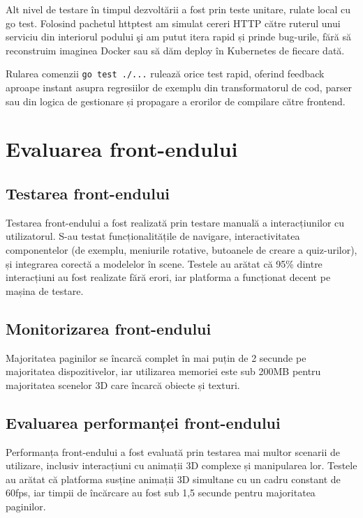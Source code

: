 Alt nivel de testare în timpul dezvoltării a fost prin teste unitare,
rulate local cu go test. Folosind pachetul httptest am
simulat cereri HTTP către ruterul unui serviciu din interiorul podului şi am putut
itera rapid și prinde bug-urile, fără să reconstruim imaginea Docker
sau să dăm deploy în Kubernetes de fiecare dată.

Rularea comenzii \verb|go test ./...| rulează orice test rapid,
oferind feedback aproape instant asupra
regresiilor de exemplu din transformatorul de cod, parser sau din logica de
gestionare și propagare a erorilor de compilare către frontend.

\section{Evaluarea front-endului}
\label{subsec:evaluare-frontend}

\subsection{Testarea front-endului}
\label{subsubsec:evaluare-frontend-testare}

Testarea front-endului a fost realizată prin testare manuală a interacțiunilor cu utilizatorul. 
S-au testat funcționalitățile de navigare, interactivitatea componentelor (de exemplu, meniurile rotative, butoanele de creare a quiz-urilor),
și integrarea corectă a modelelor în scene. Testele au arătat că 95\% dintre interacțiuni au fost realizate fără erori, iar platforma a funcționat
decent pe mașina de testare.


\subsection{Monitorizarea front-endului}
\label{subsubsec:evaluare-frontend-monitorizare}

Majoritatea paginilor se încarcă complet în mai puțin de 2 secunde pe majoritatea dispozitivelor, iar utilizarea memoriei este sub 
200MB pentru majoritatea scenelor 3D care încarcă obiecte și texturi.

\subsection{Evaluarea performanței front-endului}
\label{subsubsec:evaluare-frontend-performanta}

Performanța front-endului a fost evaluată prin testarea mai multor scenarii de utilizare, inclusiv interacțiuni cu animații 3D complexe 
și manipularea lor. Testele au arătat că platforma susține animații 3D simultane cu un cadru constant de 60fps, iar timpii de 
încărcare au fost sub 1,5 secunde pentru majoritatea paginilor.

